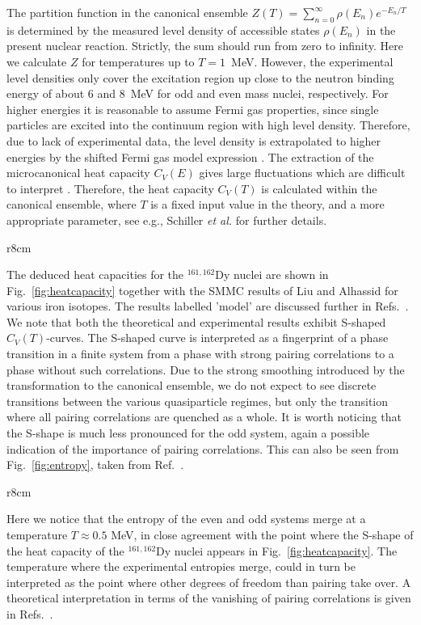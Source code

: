 The partition function in the canonical ensemble 
$Z(T)=\sum_{n=0}^\infty\rho(E_n)e^{-E_n/T} $
is determined by the measured level density of accessible states $\rho(E_n)$ in
the present nuclear reaction. Strictly, the sum should run from zero to 
infinity. Here  we calculate $Z$ for temperatures up to $T=1$~MeV. 
However, the experimental level
densities only cover the excitation region up 
close to the neutron binding energy of about 6 and 8~MeV for odd and even mass 
nuclei, respectively. For higher energies it is reasonable to assume Fermi gas 
properties, since single particles are excited into the continuum region with 
high level density. Therefore, due to lack of experimental data, the level 
density is extrapolated to higher energies by the shifted Fermi gas model 
expression \cite{GC65}. 
The extraction of the microcanonical heat capacity $C_V(E)$ gives large 
fluctuations which are difficult to interpret \cite{MB99}. Therefore, the heat 
capacity $C_V(T)$ is calculated within the canonical ensemble, where $T$ is a 
fixed input value in the theory, and a more appropriate parameter,
see e.g., Schiller {\em et al.} \cite{schiller2001} for further details.
\begin{wrapfigure}{r}{8cm}
          {\epsfxsize=14pc }
          \caption{Heat capacity for iron isotopes, see Ref.\ \cite{Al99}, 
and for $^{161,162}$Dy. See text for further details. \label{fig:heatcapacity}}
\end{wrapfigure}
The deduced heat capacities for the $^{161,162}$Dy nuclei 
are shown in Fig.~\ref{fig:heatcapacity} together with the SMMC
results of Liu and Alhassid \cite{Al99} for various iron isotopes.
The results labelled 'model' are discussed further in Refs.\ 
\cite{magne1,magne2}. We note that both the theoretical and 
experimental results exhibit 
S-shaped $C_V(T)$-curves.
The S-shaped curve is interpreted as a 
fingerprint of a phase transition in a finite system from a phase with strong 
pairing correlations to a phase without such correlations. Due to the strong 
smoothing introduced by the transformation to the canonical ensemble, we do not
expect to see discrete transitions between the various quasiparticle regimes, 
but only the transition where all pairing correlations are quenched as a whole.
It is worth noticing that the S-shape is much less 
pronounced for the odd system,
again a possible indication of the importance of pairing correlations. 
This can also be seen from Fig.\ \ref{fig:entropy}, taken from Ref.\
\cite{magne3}.
\begin{wrapfigure}{r}{8cm}
          {\epsfxsize=14pc }
          \caption{Experimental entropy in the canonical ensemble for $^{161,162}$Dy and
for $^{171,172}$Yb. \label{fig:entropy}}
\end{wrapfigure}
Here we notice that the entropy of the even and odd systems merge
at a temperature $T\approx 0.5$ MeV, in close agreement with the point where
the S-shape of the heat capacity of 
the $^{161,162}$Dy nuclei appears  
in Fig.~\ref{fig:heatcapacity}. The temperature where 
the experimental entropies merge,
could in turn be interpreted as the point where other degrees of freedom
than pairing take over. A theoretical interpretation
in terms of the vanishing of pairing correlations is given 
in Refs.\ \cite{magne3,bdh2001}. 
